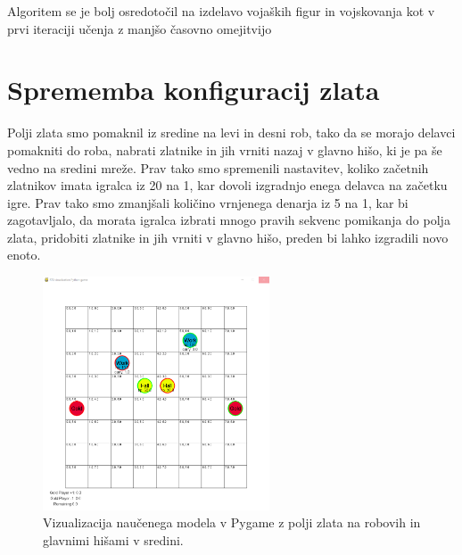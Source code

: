 \documentclass[a4paper, 12pt]{book}
\begin{document}
Algoritem se je bolj osredotočil na izdelavo vojaških figur in vojskovanja kot v prvi iteraciji učenja z manjšo časovno omejitvijo


\section{Sprememba konfiguracij zlata}
\label{resultThird}

Polji zlata smo pomaknil iz sredine na levi in desni rob, tako da se morajo delavci pomakniti do roba, nabrati zlatnike in jih vrniti nazaj v glavno hišo, ki je pa še vedno na sredini mreže.
Prav tako smo spremenili nastavitev, koliko začetnih zlatnikov imata igralca iz 20 na 1, kar dovoli izgradnjo enega delavca na začetku igre.
Prav tako smo zmanjšali količino vrnjenega denarja iz 5 na 1, kar bi zagotavljalo, da morata igralca izbrati mnogo pravih sekvenc pomikanja do polja zlata, pridobiti zlatnike in jih vrniti v glavno hišo, preden bi lahko izgradili novo enoto.

\begin{figure}[h]
	\begin{center}
		\includegraphics[width=0.6\textwidth]{photos/third-2018-11-14.pdf}
	\end{center}
	\caption{Vizualizacija naučenega modela v Pygame z polji zlata na robovih in glavnimi hišami v sredini.}
	\label{vizualizacijaRezultatovSpremembaZlata}
\end{figure}
\end{document}
